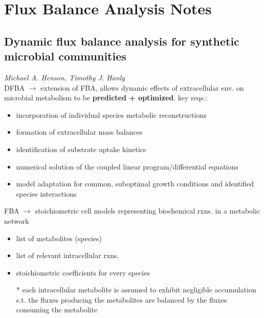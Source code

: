 



\section{Flux Balance Analysis Notes}

\subsection{Dynamic flux balance analysis for synthetic microbial communities}

\noindent \textit{Michael A. Henson, Timothy J. Hanly} \\

\noindent DFBA $\rightarrow$ extension of FBA, allows dynamic effects of
extracellular env. on microbial metabolism to be \textbf{predicted + optimized}. 
key reqs.:
\begin{itemize}
    \item incorporation of individual species metabolic reconstructions
    \item formation of extracellular mass balances
    \item identification of substrate uptake kinetics
    \item numerical solution of the coupled linear program/differential equations
    \item model adaptation for common, suboptimal growth conditions and identified species interactions
\end{itemize}

\noindent FBA  $\rightarrow$ stoichiometric cell models representing biochemical rxns. in a metabolic network
\begin{itemize}
    \item list of metabolites (species)
    \item list of relevant intracellular rxns.
    \item stoichiometric coefficients for every species
    \item[*] each intracellular metabolite is assumed to exhibit negligible
        accumulation s.t. the fluxes producing the metabolites are balanced by
        the fluxes consuming the metabolite
\end{itemize}


